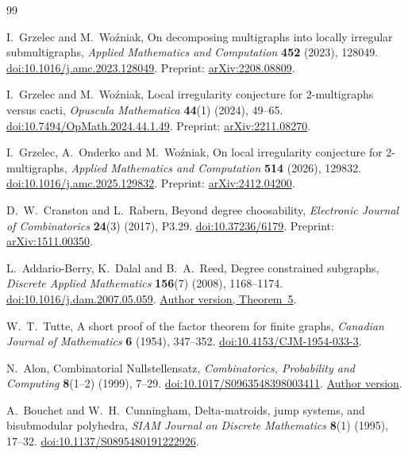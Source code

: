 \begin{thebibliography}{99}
\raggedright\small
{}
I.~Grzelec and M.~Wo\'zniak,
On decomposing multigraphs into locally irregular submultigraphs,
\emph{Applied Mathematics and Computation} \textbf{452} (2023), 128049.
\href{https://doi.org/10.1016/j.amc.2023.128049}{doi:10.1016/j.amc.2023.128049}.
Preprint: \href{https://arxiv.org/abs/2208.08809}{arXiv:2208.08809}.

I.~Grzelec and M.~Wo\'zniak,
Local irregularity conjecture for 2-multigraphs versus cacti,
\emph{Opuscula Mathematica} \textbf{44}(1) (2024), 49--65.
\href{https://doi.org/10.7494/OpMath.2024.44.1.49}{doi:10.7494/OpMath.2024.44.1.49}.
Preprint: \href{https://arxiv.org/abs/2211.08270}{arXiv:2211.08270}.

I.~Grzelec, A.~Onderko and M.~Wo\'zniak,
On local irregularity conjecture for 2-multigraphs,
\emph{Applied Mathematics and Computation} \textbf{514} (2026), 129832.
\href{https://doi.org/10.1016/j.amc.2025.129832}{doi:10.1016/j.amc.2025.129832}.
Preprint: \href{https://arxiv.org/abs/2412.04200}{arXiv:2412.04200}.

D.~W.~Cranston and L.~Rabern,
Beyond degree choosability,
\emph{Electronic Journal of Combinatorics} \textbf{24}(3) (2017), P3.29.
\href{https://doi.org/10.37236/6179}{doi:10.37236/6179}.
Preprint: \href{https://arxiv.org/abs/1511.00350}{arXiv:1511.00350}.

L.~Addario-Berry, K.~Dalal and B.~A.~Reed,
Degree constrained subgraphs,
\emph{Discrete Applied Mathematics} \textbf{156}(7) (2008), 1168--1174.
\href{https://doi.org/10.1016/j.dam.2007.05.059}{doi:10.1016/j.dam.2007.05.059}.
\href{https://problab.ca/louigi/papers/dcsubgraphs.pdf}{Author version,
Theorem~5}.

W.~T.~Tutte,
A short proof of the factor theorem for finite graphs,
\emph{Canadian Journal of Mathematics} \textbf{6} (1954), 347--352.
\href{https://doi.org/10.4153/CJM-1954-033-3}{doi:10.4153/CJM-1954-033-3}.

N.~Alon,
Combinatorial Nullstellensatz,
\emph{Combinatorics, Probability and Computing} \textbf{8}(1--2)
(1999), 7--29.
\href{https://doi.org/10.1017/S0963548398003411}{doi:10.1017/S0963548398003411}.
\href{https://web.math.princeton.edu/~nalon/PDFS/null2.pdf}{Author version}.

A.~Bouchet and W.~H.~Cunningham,
Delta-matroids, jump systems, and bisubmodular polyhedra,
\emph{SIAM Journal on Discrete Mathematics} \textbf{8}(1) (1995), 17--32.
\href{https://doi.org/10.1137/S0895480191222926}{doi:10.1137/S0895480191222926}.
\end{thebibliography}

